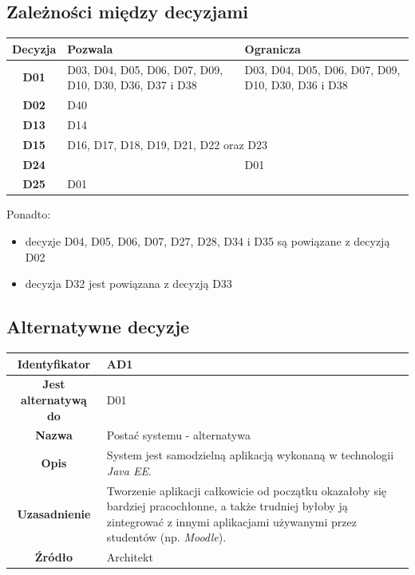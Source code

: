\subsection{Zależności między decyzjami}
\label{Chapter553}

%
\begin{table}[H]
\centering
\begin{tabular}{ | >{\bfseries}c | p{5.5cm} | p{5.5cm} | }
\hline
Decyzja & \textbf{Pozwala} & \textbf{Ogranicza} \\ \hline
%
D01 & D03, D04, D05, D06, D07, D09, D10, D30, D36, D37 i D38 & D03, D04, D05, D06, D07, D09, D10, D30, D36 i D38 \\ \hline
D02 & D40 & \\ \hline
D13 & \multicolumn{2}{|l|}{D14} \\ \hline
D15 & \multicolumn{2}{|l|}{D16, D17, D18, D19, D21, D22 oraz D23} \\ \hline
D24 & & D01 \\ \hline
D25 & \multicolumn{2}{|l|}{D01} \\ \hline
%
\end{tabular}
\end{table}
Ponadto:
\begin{itemize}
\item{decyzje D04, D05, D06, D07, D27, D28, D34 i D35 są powiązane z decyzją D02}
\item{decyzja D32 jest powiązana z decyzją D33}
\end{itemize}

\subsection{Alternatywne decyzje}
\label{Chapter554}

\begin{table}[H]
\centering
\begin{tabular}{ | >{\bfseries}c | p{11cm} | }
\hline
%
Identyfikator & AD1 \\ \hline
Jest alternatywą do & D01 \\ \hline
Nazwa & Postać systemu - alternatywa \\ \hline
Opis & System jest samodzielną aplikacją wykonaną w technologii \textit{Java EE}. \\ \hline
Uzasadnienie & Tworzenie aplikacji całkowicie od początku okazałoby się bardziej pracochłonne, a także trudniej byłoby ją zintegrować z innymi aplikacjami używanymi przez studentów (np. \textit{Moodle}). \\ \hline
Źródło & Architekt \\ \hline
%
\end{tabular}
\end{table}

